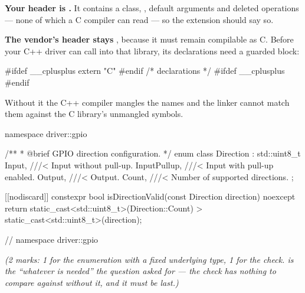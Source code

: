 \textbf{Your header is .} It contains a class, , default arguments and
deleted operations --- none of which a C compiler can read --- so the extension should say so.

\textbf{The vendor's header stays }, because it must remain compilable as C. Before your C++
driver can call into that library, its declarations need a guarded  block:

\begin{ccode}
#ifdef __cplusplus
extern "C" {
#endif
/* declarations */
#ifdef __cplusplus
}
#endif
\end{ccode}

\noindent Without it the C++ compiler mangles the names and the linker cannot match them against the
C library's unmangled symbols. 


\begin{cppcode}
namespace driver::gpio
{
/**
 * @brief GPIO direction configuration.
 */
enum class Direction : std::uint8_t
{
    Input,       ///< Input without pull-up.
    InputPullup, ///< Input with pull-up enabled.
    Output,      ///< Output.
    Count,       ///< Number of supported directions.
};

[[nodiscard]] constexpr bool isDirectionValid(const Direction direction) noexcept
{
    return static_cast<std::uint8_t>(Direction::Count) > static_cast<std::uint8_t>(direction);
}
} // namespace driver::gpio
\end{cppcode}

{\itshape (2 marks: 1 for the enumeration with a fixed underlying type, 1 for the check.
 is the ``whatever is needed'' the question asked for --- the check has nothing to
compare against without it, and it must be last.)\par}

